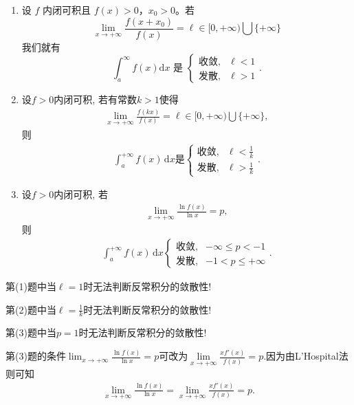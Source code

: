 \documentclass[../../main.tex]{subfiles}%
\begin{document}
\begin{example}
\begin{enumerate}[(1)]
\item 设 \( f \) 内闭可积且 \( f(x) > 0 \)，\( x_0 > 0 \)。若
\[
\lim_{x \to +\infty} \frac{f(x + x_0)}{f(x)} = \ell \in [0, +\infty) \bigcup \{ +\infty \}
\]
我们就有
\[
\int_{a}^{\infty} f(x) \mathrm{d}x \text{ 是 } 
\begin{cases} 
\text{收敛,} & \ell < 1 \\
\text{发散,} & \ell > 1 
\end{cases}.
\]

\item 设$f>0$内闭可积, 若有常数$k>1$使得
\begin{align*}
\lim_{x \to +\infty} \frac{f(kx)}{f(x)} = \ell \in [0, +\infty) \bigcup \{+\infty\},
\end{align*}
则
\begin{align*}
\int_a^{+\infty} f(x) \, \mathrm{d}x \text{是} 
\begin{cases} 
\text{收敛}, & \ell < \tfrac{1}{k} \\
\text{发散}, & \ell > \tfrac{1}{k}
\end{cases}.
\end{align*}

\item 设$f>0$内闭可积, 若
\begin{align*}
\lim_{x \to +\infty} \frac{\ln f(x)}{\ln x} = p,
\end{align*}
则
\begin{align*}
\int_a^{+\infty} f(x) \, \mathrm{d}x 
\begin{cases} 
\text{收敛}, & -\infty \leqslant p < -1 \\
\text{发散}, & -1 < p \leqslant +\infty
\end{cases}.
\end{align*}
\end{enumerate}
\end{example}
\begin{remark}
第(1)题中当$\ell =1$时无法判断反常积分的敛散性!

第(2)题中当$\ell =\frac{1}{k}$时无法判断反常积分的敛散性!

第(3)题中当$p =1$时无法判断反常积分的敛散性!

第(3)题的条件$\lim_{x \to +\infty} \frac{\ln f(x)}{\ln x} = p$可改为$\underset{x\rightarrow +\infty}{\lim}\frac{xf' \left( x \right)}{f\left( x \right)}=p$.因为由L'Hospital法则可知
\begin{align*}
\lim_{x\rightarrow +\infty} \frac{\ln f(x)}{\ln x}=\underset{x\rightarrow +\infty}{\lim}\frac{xf' \left( x \right)}{f\left( x \right)}=p.
\end{align*}
\end{remark}
\end{document}

